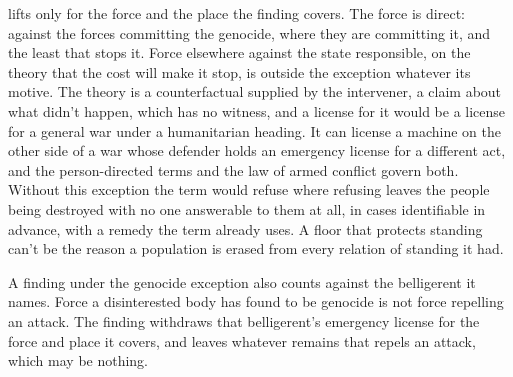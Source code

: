 lifts only for the force and the place the finding covers. The force is direct: against the forces committing the genocide, where they are committing it, and the least that stops it. Force elsewhere against the state responsible, on the theory that the cost will make it stop, is outside the exception whatever its motive. The theory is a counterfactual supplied by the intervener, a claim about what didn't happen, which has no witness, and a license for it would be a license for a general war under a humanitarian heading. It can license a machine on the other side of a war whose defender holds an emergency license for a different act, and the person-directed terms and the law of armed conflict govern both. Without this exception the term would refuse where refusing leaves the people being destroyed with no one answerable to them at all, in cases identifiable in advance, with a remedy the term already uses. A floor that protects standing can't be the reason a population is erased from every relation of standing it had.

A finding under the genocide exception also counts against the belligerent it names. Force a disinterested body has found to be genocide is not force repelling an attack. The finding withdraws that belligerent's emergency license for the force and place it covers, and leaves whatever remains that repels an attack, which may be nothing.
